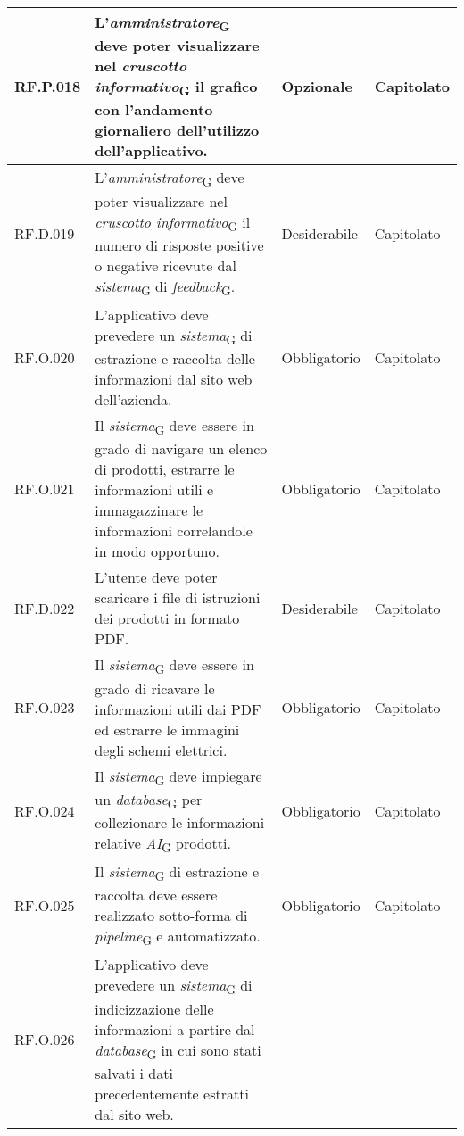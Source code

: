 \begin{table}[H]
\centering
    \begin{tabular}{|C{2.7cm}|L{7.2cm}|C{2.7cm}|C{2cm}|}
        \hline
        RF.P.018 & L'\textit{amministratore}\textsubscript{G} deve poter visualizzare nel \textit{cruscotto informativo}\textsubscript{G} il grafico con l'andamento giornaliero dell’utilizzo dell’applicativo.
         & Opzionale & Capitolato \\
        \hline
        RF.D.019 & L'\textit{amministratore}\textsubscript{G} deve poter visualizzare nel \textit{cruscotto informativo}\textsubscript{G} il numero di risposte positive o negative ricevute dal \textit{sistema}\textsubscript{G} di \textit{feedback}\textsubscript{G}.
         & Desiderabile & Capitolato \\
        \hline
        RF.O.020 &  L’applicativo deve prevedere un \textit{sistema}\textsubscript{G} di estrazione e raccolta delle informazioni dal sito web dell'azienda.
         & Obbligatorio & Capitolato \\
        \hline
         RF.O.021 & Il \textit{sistema}\textsubscript{G} deve essere in grado di navigare un elenco di prodotti, estrarre le informazioni utili e immagazzinare le informazioni correlandole in modo opportuno.
         & Obbligatorio & Capitolato \\
        \hline
         RF.D.022 & L'utente deve poter scaricare i file di istruzioni dei prodotti in formato PDF.
         & Desiderabile & Capitolato \\
        \hline
         RF.O.023 & Il \textit{sistema}\textsubscript{G} deve essere in grado di ricavare le informazioni utili dai PDF ed estrarre le immagini degli schemi elettrici.
         & Obbligatorio & Capitolato \\
        \hline
         RF.O.024 & Il \textit{sistema}\textsubscript{G} deve impiegare un \textit{database}\textsubscript{G} per collezionare le informazioni relative \textit{AI}\textsubscript{G} prodotti.
         & Obbligatorio & Capitolato \\
        \hline
         RF.O.025 & Il \textit{sistema}\textsubscript{G} di estrazione e raccolta deve essere realizzato sotto-forma di \textit{pipeline}\textsubscript{G} e automatizzato.
         & Obbligatorio & Capitolato \\
        \hline
         RF.O.026 & L’applicativo deve prevedere un \textit{sistema}\textsubscript{G} di indicizzazione delle informazioni a partire dal
        \textit{database}\textsubscript{G} in cui sono stati salvati i dati precedentemente estratti dal sito web.

\end{tabular}
\end{table}
